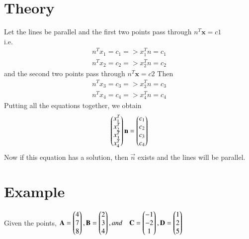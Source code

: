 \documentclass[journal,12pt,twocolumn]{IEEEtran}
\begin{document}
\section{Theory}
Let the lines be parallel and the first two points pass through $n^T\textbf{x} = c1$\\
i.e.
\begin{align*}
	n^Tx_1=c_1 => x_1^Tn = c_1 \\
	n^Tx_2=c_2 => x_2^Tn = c_2
\end{align*}
and the second two points pass through $n^T\textbf{x} = c2$
Then
\begin{align*}
	n^Tx_3=c_3 => x_3^Tn = c_3 \\
	n^Tx_4=c_4 => x_4^Tn = c_4
\end{align*}
Putting all the equations together, we obtain
\begin{align*}
	\begin{pmatrix}x_1^T\\x_2^T\\x_3^T\\x_4^T\end{pmatrix}\mathbf{n} = \begin{pmatrix}c_1\\c_2\\c_3\\c_4\end{pmatrix}
\end{align*}
Now if this equation has a solution, then $\vec{n}$ exists and the lines will be parallel.\\
\vspace{3mm}
\section{Example}
Given the points, $\mathbf{A} = \begin{pmatrix} 4\\7\\	8\end{pmatrix}, 
\mathbf{B} = \begin{pmatrix} 2\\ 3\\ 4\end{pmatrix}, and \quad
\mathbf{C} = \begin{pmatrix} -1\\ -2\\ 1 \end{pmatrix}, 
\mathbf{D} = \begin{pmatrix} 1\\ 2\\ 5\end{pmatrix} $\\
\end{document}
